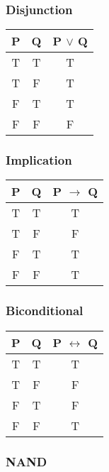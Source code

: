 \begin{multicols}{2}
\subsubsection{Disjunction}

\begin{table}[H]
\centering
\begin{tabular}[t]{|c|c|c|}
\hline
\textbf{P} & \textbf{Q} & \textbf{P $\lor$ Q} \\ \hline
T & T & T \\ \hline
T & F & T \\ \hline
F & T & T \\ \hline
F & F & F \\ \hline
\end{tabular}
\end{table}

\subsubsection{Implication}

\begin{table}[H]
\centering
\begin{tabular}[t]{|c|c|c|}
\hline
\textbf{P} & \textbf{Q} & \textbf{P $\to$ Q} \\ \hline
T & T & T \\ \hline
T & F & F \\ \hline
F & T & T \\ \hline
F & F & T \\ \hline
\end{tabular}
\end{table}

\subsubsection{Biconditional}

\begin{table}[H]
\centering
\begin{tabular}[t]{|c|c|c|}
\hline
\textbf{P} & \textbf{Q} & \textbf{P $\leftrightarrow$ Q} \\ \hline
T & T & T \\ \hline
T & F & F \\ \hline
F & T & F \\ \hline
F & F & T \\ \hline
\end{tabular}
\end{table}

\subsubsection{NAND}


\end{multicols}
